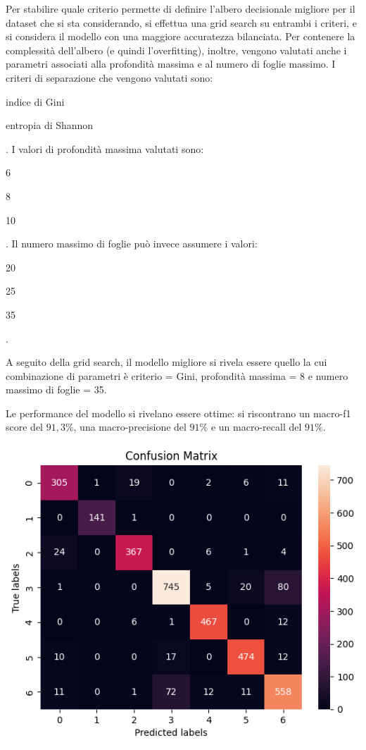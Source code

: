 Per stabilire quale criterio permette di definire l'albero decisionale
migliore per il dataset che si sta considerando, si effettua una grid search
su entrambi i criteri, e si considera il modello con una maggiore
accuratezza bilanciata.
Per contenere la complessità dell'albero (e quindi l'overfitting), inoltre,
vengono valutati anche i parametri associati alla profondità massima
e al numero di foglie massimo.
I criteri di separazione che vengono valutati sono: \begin{itemize*}
    \item indice di Gini
    \item entropia di Shannon
\end{itemize*}.
I valori di profondità massima valutati sono: \begin{itemize*}
    \item 6
    \item 8
    \item 10
\end{itemize*}.
Il numero massimo di foglie può invece assumere i valori: \begin{itemize*}
    \item 20
    \item 25
    \item 35
\end{itemize*}.

A seguito della grid search, il modello migliore si rivela essere quello la cui
combinazione di parametri è criterio = Gini, profondità massima = 8 e numero massimo
di foglie = 35.

Le performance del modello si rivelano essere ottime: si riscontrano 
un macro-f1 score del $91,3\%$, una macro-precisione del $91\%$ e 
un macro-recall del $91\%$.

\begin{Figure}
    \centering
    \includegraphics[width=\linewidth]{img/tree_confusion_matrix.png}
\end{Figure}


